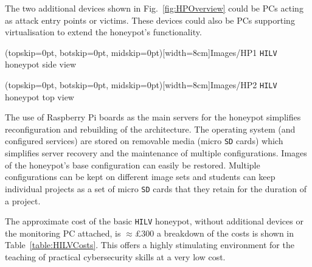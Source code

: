 \documentclass{ieeeaccess}
\begin{document}
The two additional devices shown in Fig.~\ref{fig:HPOverview} could be PCs
acting as attack entry points or victims. These devices could also be PCs
supporting virtualisation to extend the honeypot's functionality.

\Figure[t!](topskip=0pt, botskip=0pt, midskip=0pt)[width=8cm]{Images/HP1}
{\texttt{HILV} honeypot side view\label{fig:HP1}}

\Figure[t!](topskip=0pt, botskip=0pt, midskip=0pt)[width=8cm]{Images/HP2}
{\texttt{HILV} honeypot top view\label{fig:HP2}}



The use of Raspberry Pi boards as the main servers for the honeypot simplifies
reconfiguration and rebuilding of the architecture.  The operating system (and
configured services) are stored on removable media (micro \texttt{SD} cards) which
simplifies server recovery and the maintenance of multiple configurations.
Images of the honeypot's base configuration can easily be restored. Multiple
configurations can be kept on different image sets and students can keep
individual projects as a set of micro \texttt{SD} cards that they retain for the
duration of a project.

The approximate cost of the basic \texttt{HILV} honeypot, without additional
devices or the monitoring PC attached, is $\approx$\pounds300 a breakdown of the costs is shown in Table~\ref{table:HILVCosts}. This offers a highly stimulating environment for the teaching of practical cybersecurity skills at a
very low cost.
\end{document}
